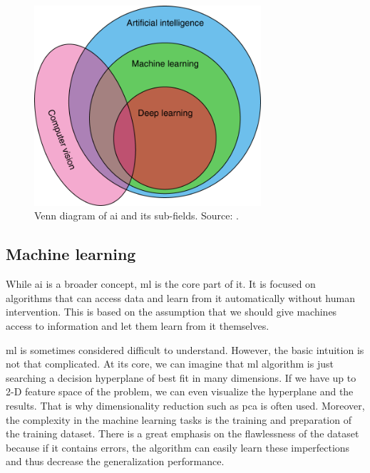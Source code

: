         \begin{figure}[ht]
            \centering
            \includegraphics[width=0.75\textwidth]{resources/artificial_intelligence_set.png}
            \caption{Venn diagram of \gls{ai} and its sub-fields. Source: \cite{ruffle2018artificial}.}
            \label{fig:image_classification}
        \end{figure}
    
    \subsection{Machine learning}
        While \gls{ai} is a broader concept, \gls{ml} is the core part of it. It is focused on algorithms that can access data and learn from it automatically without human intervention. This is based on the assumption that we should give machines access to information and let them learn from it themselves.
        
        \Gls{ml} is sometimes considered difficult to understand. However, the basic intuition is not that complicated. At its core, we can imagine that \gls{ml} algorithm is just searching a decision hyperplane of best fit in many dimensions. If we have up to 2-D feature space of the problem, we can even visualize the hyperplane and the results. That is why dimensionality reduction such as \gls{pca} \cite{pearson1901liii} is often used. Moreover, the complexity in the machine learning tasks is the training and preparation of the training dataset. There is a great emphasis on the flawlessness of the dataset because if it contains errors, the algorithm can easily learn these imperfections and thus decrease the generalization performance. 
        

